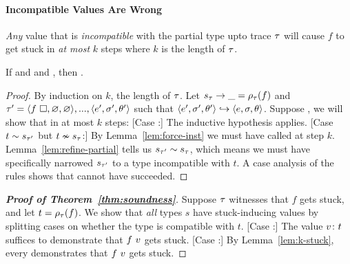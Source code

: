 \paragraph{Incompatible Values Are Wrong}
%
\emph{Any} value that is \emph{incompatible} with
the partial type upto trace $\tau$ will cause $f$ to get stuck
in \emph{at most} $k$ steps where $k$ is the length of $\tau$.
%
\begin{lem}
\label{lem:k-stuck}
  If  and
      and
     ,
  then
     .
\end{lem}
\begin{proof}
  By induction on $k$, the length of $\tau$.
  Let $s_{\tau} \rightarrow \_ = \rho_{\tau}(f)$ and
  $\tau' = \langle f\ \square{}, \varnothing, \varnothing \rangle,...,\langle e', \sigma', \theta' \rangle$
  such that $\langle e', \sigma', \theta' \rangle \hookrightarrow \langle e, \sigma, \theta \rangle$.
  Suppose , we
  will show that 
  in at most $k$ steps:
%
  [Case :]
    The inductive hypothesis applies.
  [Case $t \sim s_{\tau'}$ but $t \nsim s_{\tau}$:]
    By Lemma~\ref{lem:force-inst} we must have called \forcesym at step
    $k$.
    Lemma~\ref{lem:refine-partial} tells us
    $s_{\tau'} \sim s_{\tau}$, which means we must have
    specifically narrowed $s_{\tau'}$ to a type incompatible with $t$.
    A case analysis of the rules shows that \forcesym cannot have
    succeeded.
\end{proof}

\begin{proof}[\textbf{Proof of Theorem~\ref{thm:soundness}}]
%
Suppose $\tau$ witnesses that $f$ gets stuck,
and let $t = \rho_{\tau}(f)$.
We show that \emph{all} types $s$ have stuck-inducing
values by splitting cases on whether the type is
compatible with $t$. %
%
  [Case :]
   The value ${v} \colon {t}$ suffices to demonstrate that $f\ v$
   gets stuck.
  [Case :]
   By Lemma~\ref{lem:k-stuck}, every  demonstrates that
   $f\ v$ gets stuck.
\end{proof}

